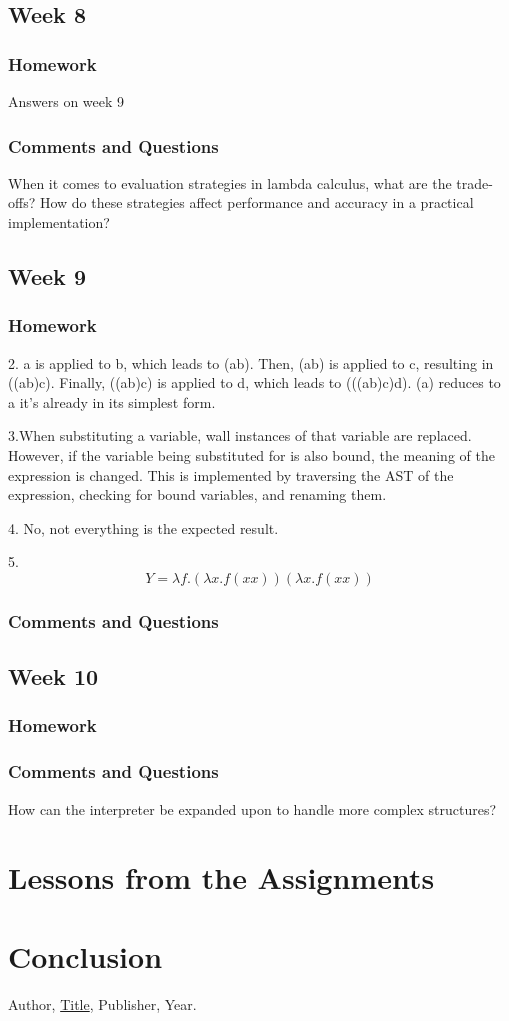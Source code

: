 \documentclass{article}
\theoremstyle{theorem}
\theoremstyle{definition}
\theoremstyle{remark}
\begin{document}
\subsection{Week 8}
\subsubsection*{Homework}
Answers on week 9
\subsubsection*{Comments and Questions}
When it comes to evaluation strategies in lambda calculus, what are the trade-offs? How do these strategies affect performance and accuracy in a practical implementation?

\subsection{Week 9}
\subsubsection*{Homework}
2. a is applied to b, which leads to (ab). Then, (ab) is applied to c, resulting in ((ab)c). Finally, ((ab)c) is applied to d, which leads to (((ab)c)d). (a) reduces to a it's already in its simplest form.

3.When substituting a variable, wall instances of that variable are replaced. However, if the variable being substituted for is also bound, the meaning of the expression is changed. This is implemented by traversing the AST of the expression, checking for bound variables, and renaming them.

4. No, not everything is the expected result.

5. \[Y=\lambda f.(\lambda x.f(xx))(\lambda x.f(xx))\]

\subsubsection*{Comments and Questions}

\subsection{Week 10}
\subsubsection*{Homework}
\subsubsection*{Comments and Questions}
How can the interpreter be expanded upon to handle more complex structures?

\section{Lessons from the Assignments}


\section{Conclusion}\label{conclusion}


\begin{thebibliography}{99}
 Author, \href{https://en.wikipedia.org/wiki/LaTeX}{Title}, Publisher, Year.
\end{thebibliography}
\end{document}
